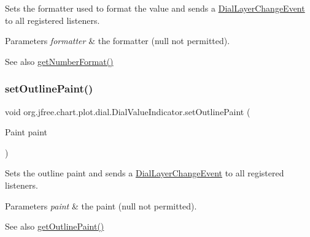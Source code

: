 Sets the formatter used to format the value and sends a \mbox{\hyperlink{classorg_1_1jfree_1_1chart_1_1plot_1_1dial_1_1_dial_layer_change_event}{Dial\+Layer\+Change\+Event}} to all registered listeners.


\begin{DoxyParams}{Parameters}
{\em formatter} & the formatter ({\ttfamily null} not permitted).\\
\hline
\end{DoxyParams}
\begin{DoxySeeAlso}{See also}
\mbox{\hyperlink{classorg_1_1jfree_1_1chart_1_1plot_1_1dial_1_1_dial_value_indicator_a3c320a660cacb2e7ed3abca17f2ff0f0}{get\+Number\+Format()}} 
\end{DoxySeeAlso}
\mbox{\label{classorg_1_1jfree_1_1chart_1_1plot_1_1dial_1_1_dial_value_indicator_a7f21f73770eb70660be994c562527efd}} 
\subsubsection{\texorpdfstring{set\+Outline\+Paint()}{setOutlinePaint()}}
{\footnotesize\ttfamily void org.\+jfree.\+chart.\+plot.\+dial.\+Dial\+Value\+Indicator.\+set\+Outline\+Paint (\begin{DoxyParamCaption}\item[{Paint}]{paint }\end{DoxyParamCaption})}

Sets the outline paint and sends a \mbox{\hyperlink{classorg_1_1jfree_1_1chart_1_1plot_1_1dial_1_1_dial_layer_change_event}{Dial\+Layer\+Change\+Event}} to all registered listeners.


\begin{DoxyParams}{Parameters}
{\em paint} & the paint ({\ttfamily null} not permitted).\\
\hline
\end{DoxyParams}
\begin{DoxySeeAlso}{See also}
\mbox{\hyperlink{classorg_1_1jfree_1_1chart_1_1plot_1_1dial_1_1_dial_value_indicator_ac6b32663e40d0974847158407e09557a}{get\+Outline\+Paint()}} 
\end{DoxySeeAlso}
\mbox{\label{classorg_1_1jfree_1_1chart_1_1plot_1_1dial_1_1_dial_value_indicator_a011518ddf643ceb484fc659d46875123}} 
